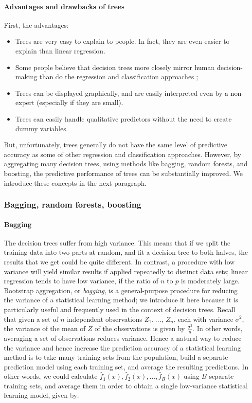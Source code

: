 \paragraph{Advantages and drawbacks of trees}
First, the advantages:
\begin{itemize}
    \item Trees are very easy to explain to people. In fact, they are even easier to explain than
linear regression.
    \item Some people believe that decision trees more closely mirror human decision-making than do
the regression and classification approaches ;
    \item Trees can be displayed graphically, and are easily interpreted even by a non-expert
(especially if they are small).
    \item Trees can easily handle qualitative predictors without the need to create dummy variables.
\end{itemize}

But, unfortunately, trees generally do not have the same level of predictive accuracy as some of
other regression and classification approaches. However, by aggregating many decision trees, using
methods like bagging, random forests, and boosting, the predictive performance of trees can be
substantially improved. We introduce these concepts in the next paragraph.

\subsubsection{Bagging, random forests, boosting}

\paragraph{Bagging}
The decision trees suffer from high variance. This means that if we split the training data into two
parts at random, and fit a decision tree to both halves, the results that we get could be quite
different. In contrast, a procedure with low variance will yield similar results if applied
repeatedly to distinct data sets; linear regression tends to have low variance, if the ratio of $n$
to $p$ is moderately large. Bootstrap aggregation, or \textit{bagging}, is a general-purpose
procedure for reducing the variance of a statistical learning method; we introduce it here because
it is particularly useful and frequently used in the context of decision trees. Recall that given a
set of $n$ independent observations $Z_1$, ..., $Z_n$, each with variance $\sigma^2$, the variance
of the mean of $Z$ of the observations is given by $\frac{\sigma^2}{n}$. In other words, averaging a
set of observations reduces variance. Hence a natural way to reduce the variance and hence increase
the prediction accuracy of a statistical learning method is to take many training sets from the
population, build a separate prediction model using each training set, and average the resulting
predictions. In other words, we could calculate $\hat{f}_1(x), \hat{f}_2(x), ..., \hat{f}_B(x)$
using $B$ separate training sets, and average them in order to obtain a single low-variance
statistical learning model, given by:

